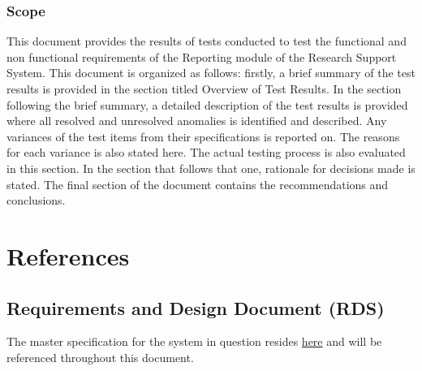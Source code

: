 \subsubsection{Scope}
This document provides the results of tests conducted to test the functional and non functional requirements of the Reporting module of the Research Support System. This document is organized as follows: firstly, a brief summary of the test results is provided in the section titled Overview of Test Results. In the section following the brief summary, a detailed description of the test results is provided where all resolved and unresolved anomalies is identified and described. Any variances of the test items from their specifications is reported on. The reasons for each variance is also stated here. The actual testing process is also evaluated in this section. In the section that follows that one, rationale for decisions made is stated. The final section of the document contains the recommendations and conclusions.

\section{References} \label{sectionReferences}
\subsection{Requirements and Design Document (RDS)}
\hypersetup{
	linkcolor = blue       
}   
The master specification for the system in question resides \href{https://clickup.up.ac.za/bbcswebdav/pid-791422-dt-content-rid-8256558_1/xid-8256558_1}{here} and will be referenced throughout this document.
\hypersetup{
	linkcolor = black       
} 